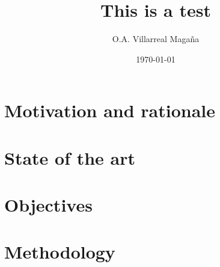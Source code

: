 \documentclass[a4paper]{article}
\title{This is a test}
\author{O.A. Villarreal Maga\~na}
\date{\today}
\begin{document}
\maketitle
\thispagestyle{empty}
\setcounter{page}{1}


\thispagestyle{empty} 
\thispagestyle{empty}




 
 
%

%



\section{Motivation and rationale}
 

\section{State of the art}
 

\section{Objectives}
 

\section{Methodology}
 
\end{document}
